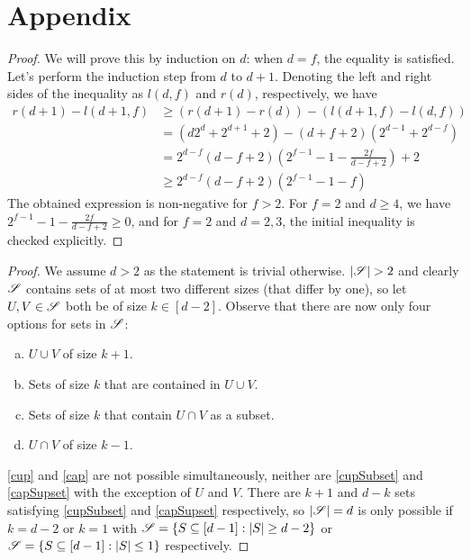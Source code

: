 \appendix

\section{Appendix}\label{appendix}

\dfInequality*
\begin{proof}
    We will prove this by induction on $d$: when $d=f$, the equality is satisfied. Let's perform the induction step from $d$ to $d+1$. Denoting the left and right sides of the inequality as $l(d, f)$ and $r(d)$, respectively, we have
    \begin{equation*}
        \begin{split}
            r(d+1) - l(d+1, f) 
            & \geq \left(r(d+1) - r(d)\right) - \left(l(d+1, f) - l(d, f)\right) \\
            & = \left(d2^d + 2^{d+1} + 2\right) - \left(d+f+2\right)\left(2^{d-1}+2^{d-f}\right) \\
            & = 2^{d-f}\left(d-f+2\right)\left(2^{f-1}-1-\frac{2f}{d-f+2}\right)+2 \\
            & \geq 2^{d-f}\left(d-f+2\right)\left(2^{f-1}-1-f\right)
        \end{split}
    \end{equation*}
    The obtained expression is non-negative for $f>2$. For $f=2$ and $d\geq4$, we have $2^{f-1}-1-\frac{2f}{d-f+2}\geq0$, and for $f=2$ and $d=2,3$, the initial inequality is checked explicitly.    
\end{proof}

\smallDifferenceLemma*
\begin{proof}
    We assume $d>2$ as the statement is trivial otherwise. $|\sss|>2$ and clearly ${\mathscr{S}}$ contains sets of at most two different sizes (that differ by one), so let $U, V \in {\mathscr{S}}$ both be of size $k\in [d-2]$. Observe that there are now only four options for sets in ${\mathscr{S}}$:
    \begin{enumerate}[(a)]
        \item $U \cup V$ of size $k+1$. \label{cup}
        \item Sets of size $k$ that are contained in $U \cup V$. \label{cupSubset}
        \item Sets of size $k$ that contain $U\cap V$ as a subset. \label{capSupset}
        \item $U \cap V$ of size $k-1$. \label{cap}
    \end{enumerate}
    \ref{cup} and \ref{cap} are not possible simultaneously, neither are \ref{cupSubset} and \ref{capSupset} with the exception of $U$ and $V$. There are $k+1$ and $d-k$ sets satisfying \ref{cupSubset} and \ref{capSupset} respectively, so $|{\mathscr{S}}|=d$ is only possible if $k=d-2$ or $k=1$ with ${\mathscr{S}} = \{S\subseteq[d-1]: |S| \geq d-2\}$ or ${\mathscr{S}} = \{S\subseteq[d-1]: |S| \leq 1\}$ respectively.
\end{proof}

